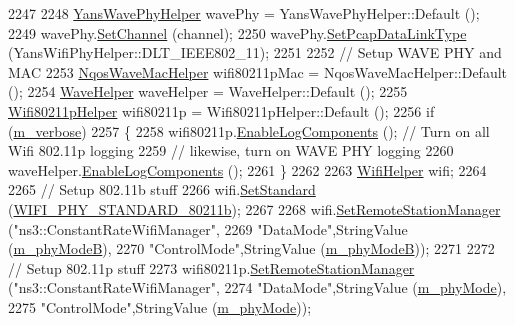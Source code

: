 \begin{DoxyCode}
2247 
2248   \hyperlink{classns3_1_1YansWavePhyHelper}{YansWavePhyHelper} wavePhy =  YansWavePhyHelper::Default ();
2249   wavePhy.\hyperlink{classns3_1_1YansWifiPhyHelper_ad2e9a27587dd4ff320435c93cc2676de}{SetChannel} (channel);
2250   wavePhy.\hyperlink{classns3_1_1WifiPhyHelper_ae4b90e90f6e78a19c1b7fdf08b270218}{SetPcapDataLinkType} (YansWifiPhyHelper::DLT\_IEEE802\_11);
2251 
2252   \textcolor{comment}{// Setup WAVE PHY and MAC}
2253   \hyperlink{classns3_1_1NqosWaveMacHelper}{NqosWaveMacHelper} wifi80211pMac = NqosWaveMacHelper::Default ();
2254   \hyperlink{classns3_1_1WaveHelper}{WaveHelper} waveHelper = WaveHelper::Default ();
2255   \hyperlink{classns3_1_1Wifi80211pHelper}{Wifi80211pHelper} wifi80211p = Wifi80211pHelper::Default ();
2256   \textcolor{keywordflow}{if} (\hyperlink{classVanetRoutingExperiment_a5ac493b7b4acea429be73f407960c7f1}{m\_verbose})
2257     \{
2258       wifi80211p.\hyperlink{classns3_1_1Wifi80211pHelper_a159fbdfa2402e78aebb00e7042ecfa08}{EnableLogComponents} ();      \textcolor{comment}{// Turn on all Wifi 802.11p logging}
2259       \textcolor{comment}{// likewise, turn on WAVE PHY logging}
2260       waveHelper.\hyperlink{classns3_1_1WaveHelper_a9b7510b4aeb982d4a01f2ae829e1ee09}{EnableLogComponents} ();
2261     \}
2262 
2263   \hyperlink{classns3_1_1WifiHelper}{WifiHelper} wifi;
2264 
2265   \textcolor{comment}{// Setup 802.11b stuff}
2266   wifi.\hyperlink{classns3_1_1WifiHelper_aa54f3e61527ef8de318d310045bc5dfd}{SetStandard} (\hyperlink{group__wifi_gga1299834f4e1c615af3ca738033b76a49a77e1cc9f77a0bce8e2bc82cbef437b5a}{WIFI\_PHY\_STANDARD\_80211b});
2267 
2268   wifi.\hyperlink{classns3_1_1WifiHelper_a3d01b178aeb2de246ab5a3aa5638ce24}{SetRemoteStationManager} (\textcolor{stringliteral}{"ns3::ConstantRateWifiManager"},
2269                                 \textcolor{stringliteral}{"DataMode"},StringValue (\hyperlink{classVanetRoutingExperiment_a82dffa1e0b2ddfd1d9afd33e35d33dfb}{m\_phyModeB}),
2270                                 \textcolor{stringliteral}{"ControlMode"},StringValue (\hyperlink{classVanetRoutingExperiment_a82dffa1e0b2ddfd1d9afd33e35d33dfb}{m\_phyModeB}));
2271 
2272   \textcolor{comment}{// Setup 802.11p stuff}
2273   wifi80211p.\hyperlink{classns3_1_1WifiHelper_a3d01b178aeb2de246ab5a3aa5638ce24}{SetRemoteStationManager} (\textcolor{stringliteral}{"ns3::ConstantRateWifiManager"},
2274                                       \textcolor{stringliteral}{"DataMode"},StringValue (\hyperlink{classVanetRoutingExperiment_af9a40202146f6e8b06fb369d697a1fe9}{m\_phyMode}),
2275                                       \textcolor{stringliteral}{"ControlMode"},StringValue (\hyperlink{classVanetRoutingExperiment_af9a40202146f6e8b06fb369d697a1fe9}{m\_phyMode}));

\end{DoxyCode}
